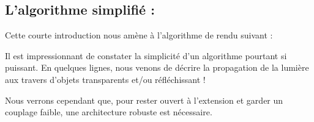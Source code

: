 \subsection{L'algorithme simplifié :}
Cette courte introduction nous amène à l'algorithme de rendu suivant :


Il est impressionnant de constater la simplicité d'un algorithme pourtant si
puissant. En quelques lignes, nous venons de décrire la propagation de la
lumière aux travers d'objets transparents et/ou réfléchissant !

Nous verrons cependant que, pour rester ouvert à l'extension et garder un
couplage faible, une architecture robuste est nécessaire.
